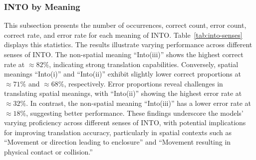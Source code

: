 
\subsubsection{INTO by Meaning}

This subsection presents the number of occurrences, correct count, error count, correct rate, and error rate for each meaning of INTO. Table~\ref{tab:into-senses} displays this statistics.  The results illustrate varying performance across different senses of INTO. The non-spatial meaning ``Into(iii)'' shows the highest correct rate at $\approx82\%$, indicating strong translation capabilities. Conversely, spatial meanings ``Into(i)'' and ``Into(ii)'' exhibit slightly lower correct proportions at $\approx71\%$ and $\approx68\%$, respectively. Error proportions reveal challenges in translating spatial meanings, with ``Into(ii)'' showing the highest error rate at $\approx32\%$. In contrast, the non-spatial meaning ``Into(iii)'' has a lower error rate at $\approx18\%$, suggesting better performance. These findings underscore the models' varying proficiency across different senses of INTO, with potential implications for improving translation accuracy, particularly in spatial contexts such as ``Movement or direction leading to enclosure'' and ``Movement resulting in physical contact or collision.''


